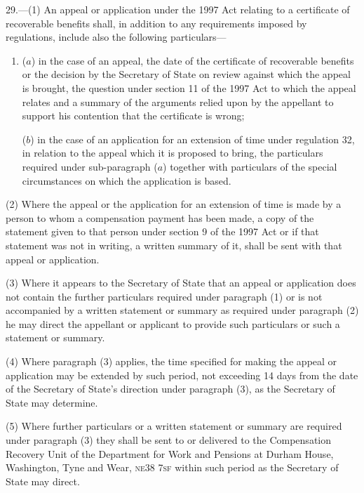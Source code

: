 \documentclass[12pt,a4paper]{article}
\begin{document}
29.—(1) An appeal or application under the 1997 Act relating to a certificate of recoverable benefits shall, in addition to any requirements imposed by regulations, include also the following particulars—
\begin{enumerate}\item[]
($a$) in the case of an appeal, the date of the certificate of recoverable benefits or the decision by the Secretary of State on review against which the appeal is brought, the question under section 11 of the 1997 Act to which the appeal relates and a summary of the arguments relied upon by the appellant to support his contention that the certificate is wrong;

($b$) in the case of an application for an extension of time under regulation 32, in relation to the appeal which it is proposed to bring, the particulars required under sub-paragraph ($a$) together with particulars of the special circumstances on which the application is based.
\end{enumerate}

(2) Where the appeal or the application for an extension of time is made by a person to whom a compensation payment has been made, a copy of the statement given to that person under section 9 of the 1997 Act or if that statement was not in writing, a written summary of it, shall be sent with that appeal or application.

(3) Where it appears to the Secretary of State that an appeal or application does not contain the further particulars required under paragraph (1) or is not accompanied by a written statement or summary as required under paragraph (2) he may direct the appellant or applicant to provide such particulars or such a statement or summary.

(4) Where paragraph (3) applies, the time specified for making the appeal or application may be extended by such period, not exceeding 14 days from the date of the Secretary of State’s direction under paragraph (3), as the Secretary of State may determine.

(5) Where further particulars or a written statement or summary are required under paragraph (3) they shall be sent to or delivered to the Compensation Recovery Unit of the 
Department for Work and Pensions  %
at 
Durham House, Washington, Tyne and Wear, \textsc{\lowercase{NE38 7SF}}  %
within such period as the Secretary of State may direct.
\end{document}
